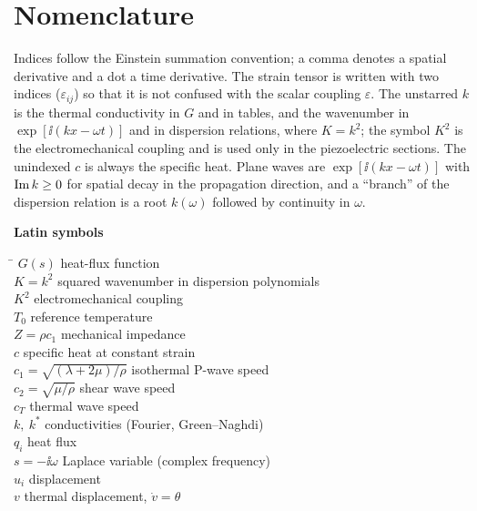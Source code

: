 \section*{Nomenclature}\label{app:nomenclature}
Indices follow the Einstein summation convention; a comma denotes a spatial derivative and a dot a time derivative. The strain tensor is written with two indices ($\varepsilon_{ij}$) so that it is not confused with the scalar coupling $\varepsilon$. The unstarred $k$ is the thermal conductivity in $G$ and in tables, and the wavenumber in $\exp[\ii(kx-\omega t)]$ and in dispersion relations, where $K=k^2$; the symbol $K^2$ is the electromechanical coupling and is used only in the piezoelectric sections. The unindexed $c$ is always the specific heat. Plane waves are $\exp[\ii(kx-\omega t)]$ with $\operatorname{Im} k\ge0$ for spatial decay in the propagation direction, and a ``branch'' of the dispersion relation is a root $k(\omega)$ followed by continuity in $\omega$.

\medskip\noindent\textbf{Latin symbols}
\begin{tabbing}
\hspace{3.2cm}\=\kill
$G(s)$ \> heat-flux function\\
$K=k^2$ \> squared wavenumber in dispersion polynomials\\
$K^2$ \> electromechanical coupling\\
$T_0$ \> reference temperature\\
$Z=\rho c_1$ \> mechanical impedance\\
$c$ \> specific heat at constant strain\\
$c_1=\sqrt{(\lambda+2\mu)/\rho}$ \> isothermal P-wave speed\\
$c_2=\sqrt{\mu/\rho}$ \> shear wave speed\\
$c_T$ \> thermal wave speed\\
$k,\ k^*$ \> conductivities (Fourier, Green--Naghdi)\\
$q_i$ \> heat flux\\
$s=-\ii\omega$ \> Laplace variable (complex frequency)\\
$u_i$ \> displacement\\
$v$ \> thermal displacement, $\dot v=\theta$\\
\end{tabbing}

